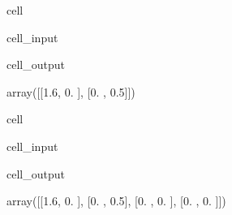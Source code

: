 \documentclass[letterpaper,10pt,english]{jupyterBook}
\begin{document}
\begin{sphinxuseclass}{cell}\begin{sphinxVerbatimInput}

\begin{sphinxuseclass}{cell_input}
\begin{sphinxVerbatim}[commandchars=\\\{\}]
\end{sphinxVerbatim}

\end{sphinxuseclass}\end{sphinxVerbatimInput}
\begin{sphinxVerbatimOutput}

\begin{sphinxuseclass}{cell_output}
\begin{sphinxVerbatim}[commandchars=\\\{\}]
array([[1.6, 0. ],
       [0. , 0.5]])
\end{sphinxVerbatim}

\end{sphinxuseclass}\end{sphinxVerbatimOutput}

\end{sphinxuseclass}
\begin{sphinxuseclass}{cell}\begin{sphinxVerbatimInput}

\begin{sphinxuseclass}{cell_input}
\begin{sphinxVerbatim}[commandchars=\\\{\}]
    
\end{sphinxVerbatim}

\end{sphinxuseclass}\end{sphinxVerbatimInput}
\begin{sphinxVerbatimOutput}

\begin{sphinxuseclass}{cell_output}
\begin{sphinxVerbatim}[commandchars=\\\{\}]
array([[1.6, 0. ],
       [0. , 0.5],
       [0. , 0. ],
       [0. , 0. ]])
\end{sphinxVerbatim}

\end{sphinxuseclass}\end{sphinxVerbatimOutput}

\end{sphinxuseclass}
\end{document}
